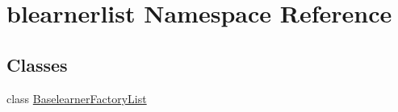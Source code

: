 \hypertarget{namespaceblearnerlist}{}\section{blearnerlist Namespace Reference}
\label{namespaceblearnerlist}
\subsection*{Classes}
\begin{DoxyCompactItemize}
\item 
class \mbox{\hyperlink{classblearnerlist_1_1_baselearner_factory_list}{Baselearner\+Factory\+List}}
\end{DoxyCompactItemize}
